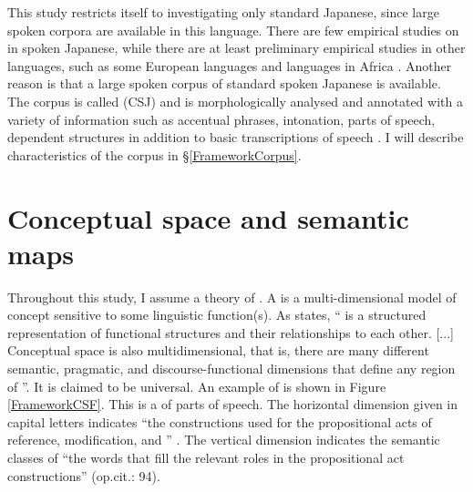 This study restricts itself to investigating only standard Japanese,
since large spoken corpora are available in this language.
There are few empirical studies on  in spoken Japanese,
while there are at least preliminary empirical studies in other languages, such as some European languages and languages in Africa \cite[e.g.,][]{cowles03,dipperetal04,dipperetal07,ritzetal08,skopeteasetal06,cookfildhauer11,chiarcosetal11}.
Another reason is that
a large spoken corpus of standard spoken Japanese is available.
The corpus is called  (CSJ) and 
is morphologically analysed and annotated with a variety of information such as accentual phrases, intonation, parts of speech, dependent structures in addition to basic transcriptions of speech \cite{maekawa03,maekawaetal04}.
I will describe characteristics of the corpus in \S \ref{FrameworkCorpus}.


\section{Conceptual space and semantic maps}\label{FrameworkSemanticMap}

Throughout this study,
I assume a theory of  \cite{croft01,haspelmath03}.
A  is a multi-dimensional model of concept sensitive to some linguistic function(s).
As  states,
`` is a structured representation of functional structures and their relationships to each other. [...] Conceptual space is also multidimensional, that is, there are many different semantic, pragmatic, and discourse-functional dimensions that define any region of ''.
It is claimed to be universal.
An example of  is shown in Figure \ref{FrameworkCSF}.
This is a  of parts of speech.
The horizontal dimension given in capital letters indicates
``the constructions used for the propositional acts of reference, modification, and '' \cite[][p.\ 93]{croft01}.
The vertical dimension indicates the semantic classes of ``the words that fill the relevant roles in the propositional act constructions''  (op.cit.: 94).

